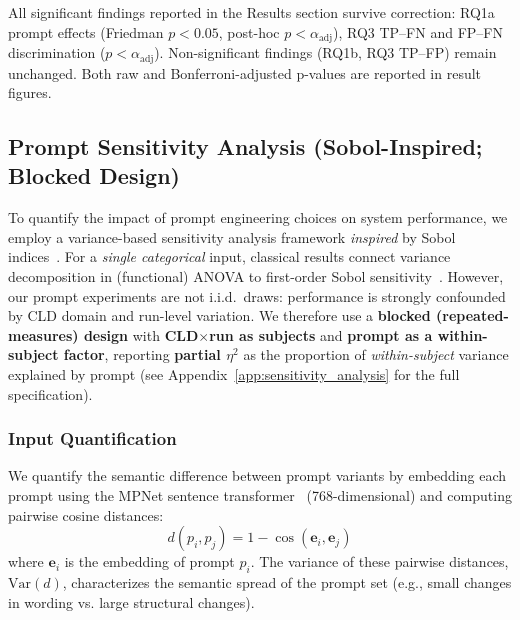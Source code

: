 All significant findings reported in the Results section survive correction: RQ1a prompt effects (Friedman $p < 0.05$, post-hoc $p < \alpha_{\text{adj}}$), RQ3 TP--FN and FP--FN discrimination ($p < \alpha_{\text{adj}}$). Non-significant findings (RQ1b, RQ3 TP--FP) remain unchanged. Both raw and Bonferroni-adjusted p-values are reported in result figures.

\subsection{Prompt Sensitivity Analysis (Sobol-Inspired; Blocked Design)}
\label{sec:sobol_sensitivity}

To quantify the impact of prompt engineering choices on system performance, we employ a variance-based sensitivity analysis framework \emph{inspired} by Sobol indices~\cite{sobol1993sensitivity}. For a \emph{single categorical} input, classical results connect variance decomposition in (functional) ANOVA to first-order Sobol sensitivity~\cite{saltelli2010variance}. However, our prompt experiments are not i.i.d.\ draws: performance is strongly confounded by CLD domain and run-level variation. We therefore use a \textbf{blocked (repeated-measures) design} with \textbf{CLD$\times$run as subjects} and \textbf{prompt as a within-subject factor}, reporting \textbf{partial $\eta^2$} as the proportion of \emph{within-subject} variance explained by prompt (see Appendix~\ref{app:sensitivity_analysis} for the full specification).

\subsubsection{Input Quantification}
We quantify the semantic difference between prompt variants by embedding each prompt using the MPNet sentence transformer~\cite{song2020mpnet} (768-dimensional) and computing pairwise cosine distances:
\begin{equation}
d(p_i, p_j) = 1 - \cos(\mathbf{e}_i, \mathbf{e}_j)
\end{equation}
where $\mathbf{e}_i$ is the embedding of prompt $p_i$. The variance of these pairwise distances, $\text{Var}(d)$, characterizes the semantic spread of the prompt set (e.g., small changes in wording vs. large structural changes).

